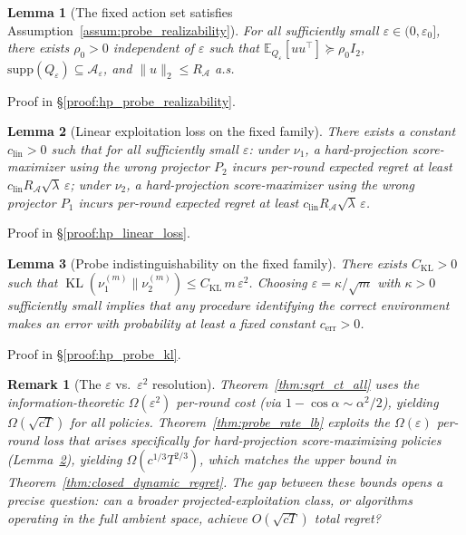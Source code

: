\documentclass{article}
\newcommand{\E}{\mathbb{E}}
\newcommand{\cA}{\mathcal{A}}
\newcommand{\supp}{\mathrm{supp}}
\DeclareMathOperator{\KL}{KL}
\newtheorem{lemma}{Lemma}
\newtheorem{remark}{Remark}
\begin{document}
\begin{lemma}[The fixed action set satisfies Assumption~\ref{assum:probe_realizability}]
\label{lem:hp_probe_realizability}
For all sufficiently small $\varepsilon \in (0, \varepsilon_0]$, there exists $\rho_0 > 0$ independent of $\varepsilon$ such that $\E_{Q_\varepsilon}[uu^\top] \succeq \rho_0 I_2$, $\supp(Q_\varepsilon) \subseteq \cA_\varepsilon$, and $\|u\|_2 \le R_{\cA}$ a.s.
\end{lemma}

Proof in \S\ref{proof:hp_probe_realizability}.

\begin{lemma}[Linear exploitation loss on the fixed family]
\label{lem:hp_linear_loss}
There exists a constant $c_{\mathrm{lin}} > 0$ such that for all sufficiently small $\varepsilon$:
under $\nu_1$, a hard-projection score-maximizer using the wrong projector $P_2$ incurs per-round expected regret at least $c_{\mathrm{lin}} R_{\cA} \sqrt{\lambda}\, \varepsilon$;
under $\nu_2$, a hard-projection score-maximizer using the wrong projector $P_1$ incurs per-round expected regret at least $c_{\mathrm{lin}} R_{\cA} \sqrt{\lambda}\, \varepsilon$.
\end{lemma}

Proof in \S\ref{proof:hp_linear_loss}.

\begin{lemma}[Probe indistinguishability on the fixed family]
\label{lem:hp_probe_kl}
There exists $C_{\mathrm{KL}} > 0$ such that $\KL(\nu_1^{(m)} \| \nu_2^{(m)}) \le C_{\mathrm{KL}}\, m\, \varepsilon^2$.
Choosing $\varepsilon = \kappa/\sqrt{m}$ with $\kappa > 0$ sufficiently small implies that any procedure identifying the correct environment makes an error with probability at least a fixed constant $c_{\mathrm{err}} > 0$.
\end{lemma}

Proof in \S\ref{proof:hp_probe_kl}.

\begin{remark}[The $\varepsilon$ vs.\ $\varepsilon^2$ resolution]
\label{rem:eps_gap_resolved}
Theorem~\ref{thm:sqrt_ct_all} uses the information-theoretic $\Omega(\varepsilon^2)$ per-round cost (via $1 - \cos\alpha \sim \alpha^2/2$), yielding $\Omega(\sqrt{cT})$ for all policies.
Theorem~\ref{thm:probe_rate_lb} exploits the $\Omega(\varepsilon)$ per-round loss that arises specifically for hard-projection score-maximizing policies (Lemma~\ref{lem:hp_linear_loss}), yielding $\Omega(c^{1/3}T^{2/3})$, which matches the upper bound in Theorem~\ref{thm:closed_dynamic_regret}.
The gap between these bounds opens a precise question: can a broader projected-exploitation class, or algorithms operating in the full ambient space, achieve $O(\sqrt{cT})$ total regret?
\end{remark}
\end{document}
